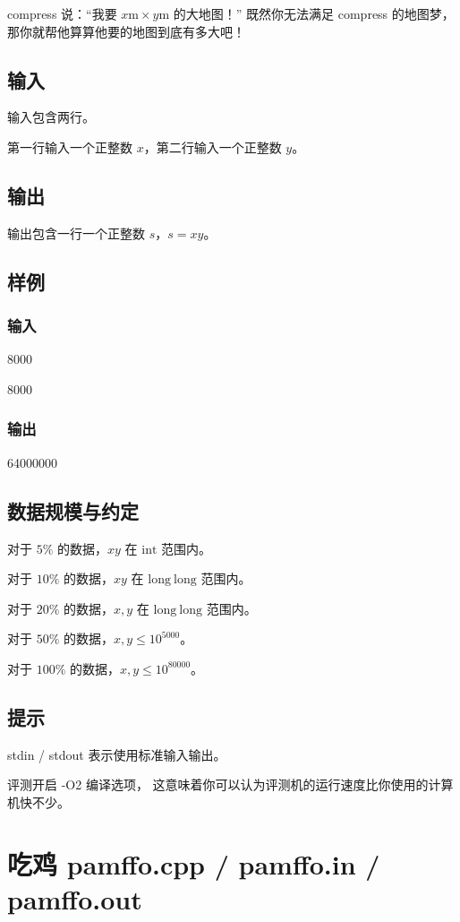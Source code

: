 \documentclass[UTF8]{article}
\begin{document}
	compress 说：“我要 $x\mathrm{m} × y\mathrm{m}$ 的大地图！”
	既然你无法满足 compress 的地图梦，
	那你就帮他算算他要的地图到底有多大吧！

	\subsection{输入}
	输入包含两行。

	第一行输入一个正整数 $x$，第二行输入一个正整数 $y$。

	\subsection{输出}
	输出包含一行一个正整数 $s$，$s = xy$。

	\subsection{样例}

	\subsubsection{输入}
	8000

	8000

	\subsubsection{输出}
	64000000

	\subsection{数据规模与约定}
	对于 $5\%$ 的数据，$xy$ 在 $\mathrm{int}$ 范围内。

	对于 $10\%$ 的数据，$xy$ 在 $\mathrm{long~long}$ 范围内。

	对于 $20\%$ 的数据，$x, y$ 在 $\mathrm{long~long}$ 范围内。

	对于 $50\%$ 的数据，$x, y \le 10^{5000}$。

	对于 $100\%$ 的数据，$x, y \le 10^{80000}$。

	\subsection{提示}
	stdin / stdout 表示使用标准输入输出。

	评测开启 -O2 编译选项，
	这意味着你可以认为评测机的运行速度比你使用的计算机快不少。

	\newpage
	\section{吃鸡 \small{pamffo.cpp / pamffo.in / pamffo.out}}
\end{document}
